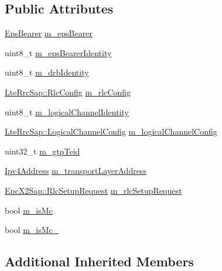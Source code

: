 \subsection*{Public Attributes}
\begin{DoxyCompactItemize}
\item 
\hyperlink{structns3_1_1EpsBearer}{Eps\+Bearer} \hyperlink{classns3_1_1LteDataRadioBearerInfo_ad2aabd3fa2da3ec21c4fe95ac50b176d}{m\+\_\+eps\+Bearer}
\item 
uint8\+\_\+t \hyperlink{classns3_1_1LteDataRadioBearerInfo_ac5ff2de272b88aab06d6a1c34955bc0e}{m\+\_\+eps\+Bearer\+Identity}
\item 
uint8\+\_\+t \hyperlink{classns3_1_1LteDataRadioBearerInfo_a1f5a7e5404b41179c7519e6bbb168de1}{m\+\_\+drb\+Identity}
\item 
\hyperlink{structns3_1_1LteRrcSap_1_1RlcConfig}{Lte\+Rrc\+Sap\+::\+Rlc\+Config} \hyperlink{classns3_1_1LteDataRadioBearerInfo_a95186fe6154ea9d8edf7dcd02414428e}{m\+\_\+rlc\+Config}
\item 
uint8\+\_\+t \hyperlink{classns3_1_1LteDataRadioBearerInfo_a53a3b4d3b2eeda6e22c32d42163ae558}{m\+\_\+logical\+Channel\+Identity}
\item 
\hyperlink{structns3_1_1LteRrcSap_1_1LogicalChannelConfig}{Lte\+Rrc\+Sap\+::\+Logical\+Channel\+Config} \hyperlink{classns3_1_1LteDataRadioBearerInfo_a588da9371e913b1cdb7dc815923c1154}{m\+\_\+logical\+Channel\+Config}
\item 
uint32\+\_\+t \hyperlink{classns3_1_1LteDataRadioBearerInfo_a7fc0e0e03bdce688663ba5a180f34e80}{m\+\_\+gtp\+Teid}
\item 
\hyperlink{classns3_1_1Ipv4Address}{Ipv4\+Address} \hyperlink{classns3_1_1LteDataRadioBearerInfo_aa6c6489199b97cbdfa6af2db6243d9a1}{m\+\_\+transport\+Layer\+Address}
\item 
\hyperlink{structns3_1_1EpcX2Sap_1_1RlcSetupRequest}{Epc\+X2\+Sap\+::\+Rlc\+Setup\+Request} \hyperlink{classns3_1_1LteDataRadioBearerInfo_ad29bbf2d45660e325f278b19518a908f}{m\+\_\+rlc\+Setup\+Request}
\item 
bool \hyperlink{classns3_1_1LteDataRadioBearerInfo_a19034922f01c0ed639aac10b66015744}{m\+\_\+is\+Mc}
\item 
bool \hyperlink{classns3_1_1LteDataRadioBearerInfo_a8fdb5b2b0145916c69f0a1e679e2e66c}{m\+\_\+is\+Mc\+\_}
\end{DoxyCompactItemize}
\subsection*{Additional Inherited Members}


